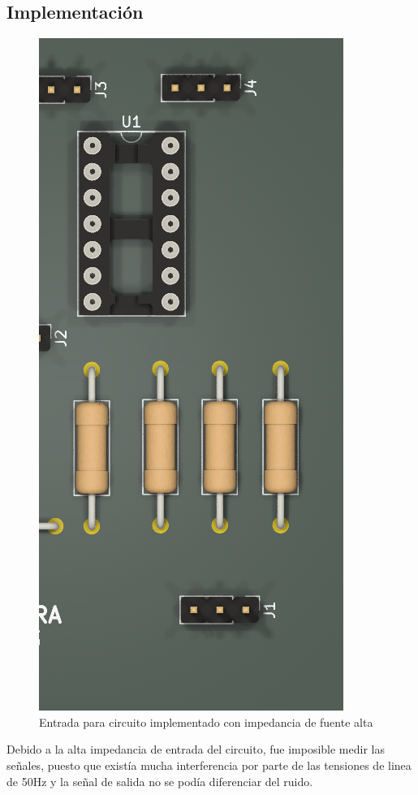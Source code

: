 \subsection{Implementación}

\begin{figure}[H]
    \centering
    \includegraphics[width=0.5\linewidth]{img/pcb2.png}
    \caption{Entrada para circuito implementado con impedancia de fuente alta}
    \label{fig:enter-label}
\end{figure}


Debido a la alta impedancia de entrada del circuito, fue imposible medir las señales, puesto que existía mucha interferencia por parte de las tensiones de linea de 50Hz y la señal de salida no se podía diferenciar del ruido.


